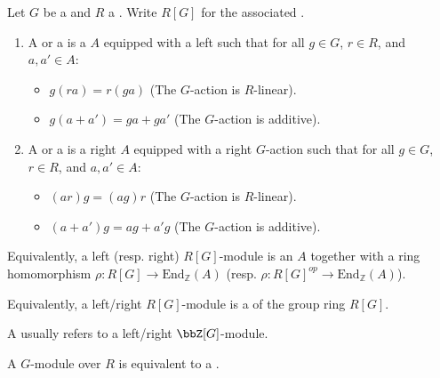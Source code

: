 \begin{definition} \label{definition:left_right_module_over_a_group_ring_of_a_group_over_a_ring}
Let $G$ be a  and $R$ a . 
Write $R[G]$ for the associated .
\begin{enumerate}
    \item A  or a  is a  $A$ equipped with a left  such that for all $g \in G$, $r \in R$, and $a, a' \in A$:
    \begin{itemize}
        \item $g(ra) = r(ga)$ (The $G$-action is $R$-linear).
        \item $g(a + a') = ga + ga'$ (The $G$-action is additive).
    \end{itemize}

    \item A  or a  is a right  $A$ equipped with a right $G$-action such that for all $g \in G$, $r \in R$, and $a, a' \in A$:
    \begin{itemize}
        \item $(ar)g = (ag)r$ (The $G$-action is $R$-linear).
        \item $(a + a')g = ag + a'g$ (The $G$-action is additive).
    \end{itemize}
\end{enumerate}
Equivalently, a left (resp. right) $R[G]$-module is an  $A$ together with a ring homomorphism $\rho: R[G] \to \text{End}_{\mathbb{Z}}(A)$ (resp. $\rho: R[G]^{op} \to \text{End}_{\mathbb{Z}}(A)$).

Equivalently, a left/right $R[G]$-module is a  of the group ring $R[G]$.

A  usually refers to a left/right $\bbZ[G]$-module.

A $G$-module over $R$ is equivalent to a . 
\end{definition}